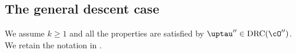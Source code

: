 \documentclass[12pt,a4paper]{amsart}
\def\eDD{\overline{\nabla}}
\numberwithin{equation}{section}
\theoremstyle{remark}
\def\drc{\mathrm{DRC}}
\def\cOpp{\cO^{\prime\prime}}
\def\uptaupp{\uptau^{\prime\prime}}
\begin{document}



\subsection{The general descent case}\label{sec:pf.gd.CD}
We  assume $k\geq 1$ and all the properties are satisfied by $\uptaupp\in \drc(\cOpp)$.
We retain the notation in .
\end{document}
